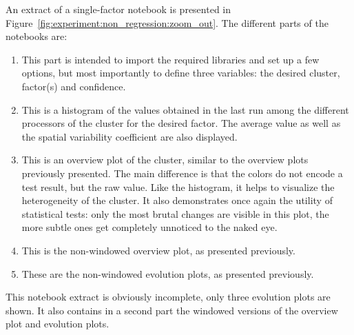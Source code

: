                 An extract of a single-factor notebook is presented in
                Figure~\ref{fig:experiment:non_regression:zoom_out}. The different parts of the notebooks are:
                \begin{enumerate}[label=\alph*]
                    \item This part is intended to import the required libraries and set up a few options, but most
                        importantly to define three variables: the desired cluster, factor(s) and confidence.
                    \item This is a histogram of the values obtained in the last run among the different processors of
                        the cluster for the desired factor. The average value as well as the spatial variability
                        coefficient are also displayed.
                    \item This is an overview plot of the cluster, similar to the overview plots previously presented.
                        The main difference is that the colors do not encode a test result, but the raw value. Like the
                        histogram, it helps to visualize the heterogeneity of the cluster. It also demonstrates once
                        again the utility of statistical tests: only the most brutal changes are visible in this plot,
                        the more subtle ones get completely unnoticed to the naked eye.
                    \item This is the non-windowed overview plot, as presented previously.
                    \item These are the non-windowed evolution plots, as presented previously.
                \end{enumerate}
                This notebook extract is obviously incomplete, only three evolution plots are shown. It also contains in
                a second part the windowed versions of the overview plot and evolution plots.

